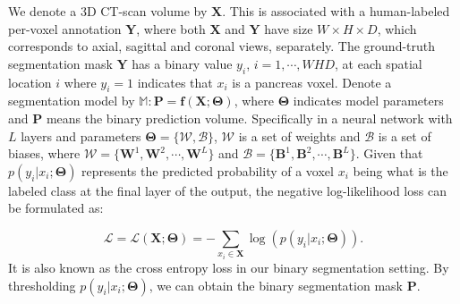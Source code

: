 \documentclass[10pt,twocolumn,letterpaper]{article}
\begin{document}
We denote a 3D CT-scan volume by $\mathbf{X}$. This is associated with a human-labeled per-voxel annotation $\mathbf{Y}$, where both $\mathbf{X}$ and $\mathbf{Y}$ have size $W\times H\times D$, which corresponds to axial, sagittal and coronal views, separately. The ground-truth segmentation mask $\mathbf{Y}$ has a binary value $y_i$, $i = 1, \cdots, WHD$, at each spatial location $i$ where $y_i = 1$ indicates that $x_i$ is a pancreas voxel. 
Denote a segmentation model by $\mathbb{M}: \mathbf{P} = {\mathbf{f}\!\left(\mathbf{X}; \boldsymbol{\Theta}\right)}$, where $\boldsymbol{\Theta}$ indicates model parameters and $\mathbf{P}$ means the binary prediction volume. Specifically in a neural network with $L$ layers and parameters $\boldsymbol{\Theta} = \{\mathcal{W}, \mathcal{B}\}$, $\mathcal{W}$ is a set of weights and $\mathcal{B}$ is a set of biases, where $\mathcal{W} = \{\mathbf{W}^1, \mathbf{W}^2, \cdots, \mathbf{W}^L\}$ and $\mathcal{B} = \{\mathbf{B}^1, \mathbf{B}^2, \cdots, \mathbf{B}^L\}$. Given that $p(y_i | x_i; \boldsymbol{\Theta})$ represents the predicted probability of a voxel $x_i$ being what is the labeled class at the final layer of the output, the negative log-likelihood loss can be formulated as:

\begin{equation}\label{Eq:SoftmaxLoss}
\mathcal{L} = \mathcal{L}(\mathbf{X}; \boldsymbol{\Theta}) = -\sum_{x_i\in \mathbf{X}}{\log(p(y_i | x_i; \boldsymbol{\Theta}))}.
\end{equation}
It is also known as the cross entropy loss in our binary segmentation setting. By thresholding $p(y_i | x_i; \boldsymbol{\Theta})$, we can obtain the binary segmentation mask $\mathbf{P}$.
\end{document}
